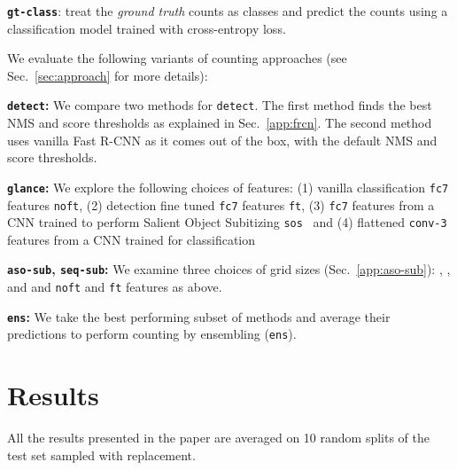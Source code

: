 \documentclass[10pt,twocolumn,letterpaper]{article}
\newcommand{\detect}{\texttt{detect}\xspace}
\newcommand{\sub}{\texttt{aso-sub}\xspace}
\newcommand{\seq}{\texttt{seq-sub}\xspace}
\newcommand{\glance}{\texttt{glance}\xspace}
\newcommand{\ens}{\texttt{ens}\xspace}
\newcommand{\refsec}[1]{Sec.~\ref{#1}}
\begin{document}
\noindent \textbf{\texttt{gt-class}}: treat the \emph{ground truth} counts as classes and predict the counts using a classification model trained with cross-entropy loss.




We evaluate the following variants of counting approaches (see \refsec{sec:approach} for more details):

\noindent \textbf{\detect{}:} We compare two methods for \detect. The first method finds the best NMS and score thresholds as explained in Sec.~\ref{app:frcn}. The second method uses vanilla Fast R-CNN as it comes out of the box, with the default NMS and score thresholds.



\noindent \textbf{\glance{}:} We explore the following choices of features: (1) vanilla classification \texttt{fc7} features \texttt{noft}, (2) detection fine tuned \texttt{fc7} features \texttt{ft}, (3) \texttt{fc7} features from a CNN trained to perform Salient Object Subitizing \texttt{sos}~\cite{zhang2015salient} and (4) flattened \texttt{conv-3} features from a CNN trained for classification  

\noindent \textbf{\sub{}, \seq{}:} We examine three choices of grid sizes (Sec.~\ref{app:aso-sub}): , , and  and \texttt{noft} and \texttt{ft} features as above.  

\noindent \textbf{\ens{}:} We take the best performing subset of methods and average their predictions to perform counting by ensembling (\ens{}).

\begin{comment}
\subsection{Datasets}
\subsubsection{PASCAL}
statistics on the datasets relevant to counting
how many objects in each discretization of associative subitizing
\subsubsection{NYU v2}
\subsubsection{COCO}
\end{comment}

 
\section{Results}\label{sec:res}
All the results presented in the paper are averaged on 10 random splits of the test set sampled with replacement. 
\end{document}
